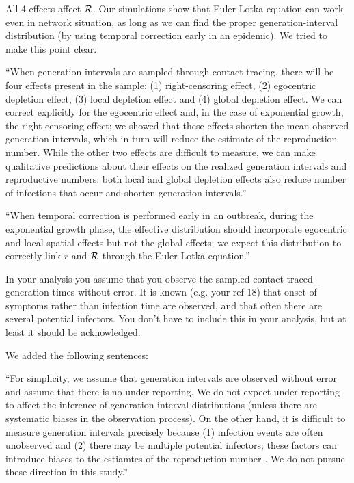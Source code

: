 \documentclass[12pt]{article}
\newcommand{\RR}{\ensuremath{{\cal R}}}
\newcommand{\revtext}{\textsf}
\begin{document}
All 4 effects affect $\RR$. Our simulations show that Euler-Lotka equation can work even in network situation, as long as we can find the proper generation-interval distribution (by using temporal correction early in an epidemic). We tried to make this point clear.

``When generation intervals are sampled through contact tracing, there will be four effects present in the sample: (1) right-censoring effect, (2) egocentric depletion effect, (3) local depletion effect and (4) global depletion effect.
We can correct explicitly for the egocentric effect and, in the case of exponential growth, the right-censoring effect;
we showed that these effects shorten the mean observed generation intervals, which in turn will reduce the estimate of the reproduction number.
While the other two effects are difficult to measure, we can make qualitative predictions about their effects on the realized generation intervals and reproductive numbers: 
both local and global depletion effects also reduce number of infections that occur and shorten generation intervals.''

``When temporal correction is performed early in an outbreak, during the exponential growth phase, the effective distribution should incorporate egocentric and local spatial effects but not the global effects; we expect this distribution to correctly link $r$ and $\RR$ through the Euler-Lotka equation.''

\revtext{In your analysis you assume that you observe the sampled contact traced generation times without error. It is known (e.g. your ref 18) that onset of symptoms rather than infection time are observed, and that often there are several potential infectors. You don't have to include this in your analysis, but at least it should be acknowledged.}

We added the following sentences:

``For simplicity, we assume that generation intervals are observed without error and assume that there is no under-reporting. 
We do not expect under-reporting to affect the inference of generation-interval distributions (unless there are systematic biases in the observation process).
On the other hand, it is difficult to measure generation intervals precisely because (1) infection events are often unobserved and (2) there may be multiple potential infectors; these factors can introduce biases to the estiamtes of the reproduction number \cite{britton2019estimation}.
We do not pursue these direction in this study.''
\end{document}

